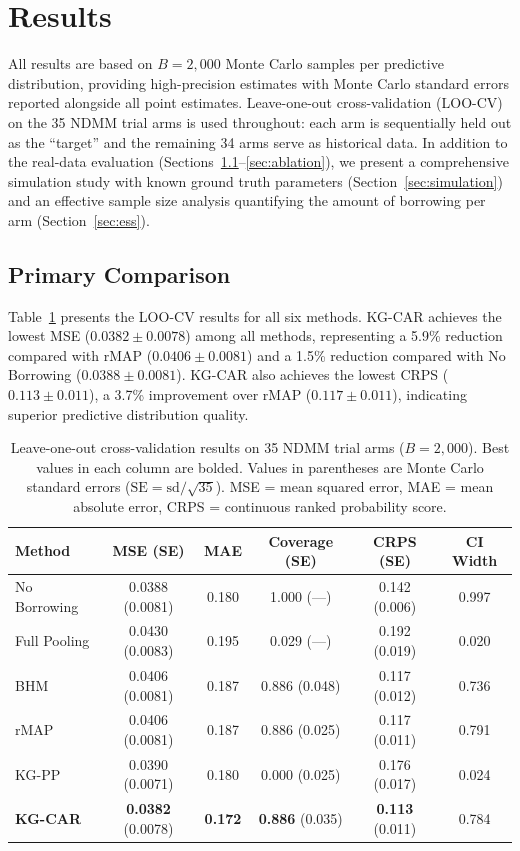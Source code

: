 \documentclass[12pt]{article}
\begin{document}
\section{Results}
\label{sec:results}

All results are based on $B = 2{,}000$ Monte Carlo samples per predictive distribution, providing high-precision estimates with Monte Carlo standard errors reported alongside all point estimates. Leave-one-out cross-validation (LOO-CV) on the 35 NDMM trial arms is used throughout: each arm is sequentially held out as the ``target'' and the remaining 34 arms serve as historical data. In addition to the real-data evaluation (Sections~\ref{sec:primary}--\ref{sec:ablation}), we present a comprehensive simulation study with known ground truth parameters (Section~\ref{sec:simulation}) and an effective sample size analysis quantifying the amount of borrowing per arm (Section~\ref{sec:ess}).

\subsection{Primary Comparison}
\label{sec:primary}

Table~\ref{tab:loocv} presents the LOO-CV results for all six methods. KG-CAR achieves the lowest MSE ($0.0382 \pm 0.0078$) among all methods, representing a 5.9\% reduction compared with rMAP ($0.0406 \pm 0.0081$) and a 1.5\% reduction compared with No Borrowing ($0.0388 \pm 0.0081$). KG-CAR also achieves the lowest CRPS ($0.113 \pm 0.011$), a 3.7\% improvement over rMAP ($0.117 \pm 0.011$), indicating superior predictive distribution quality.

\begin{table}[ht]
\centering
\caption{Leave-one-out cross-validation results on 35 NDMM trial arms ($B = 2{,}000$). Best values in each column are bolded. Values in parentheses are Monte Carlo standard errors ($\text{SE} = \text{sd}/\sqrt{35}$). MSE = mean squared error, MAE = mean absolute error, CRPS = continuous ranked probability score.}
\label{tab:loocv}
\begin{tabular}{lccccc}
\toprule
Method & MSE (SE) & MAE & Coverage (SE) & CRPS (SE) & CI Width \\
\midrule
No Borrowing & 0.0388 (0.0081) & 0.180 & 1.000 (---) & 0.142 (0.006) & 0.997 \\
Full Pooling & 0.0430 (0.0083) & 0.195 & 0.029 (---) & 0.192 (0.019) & 0.020 \\
BHM & 0.0406 (0.0081) & 0.187 & 0.886 (0.048) & 0.117 (0.012) & 0.736 \\
rMAP & 0.0406 (0.0081) & 0.187 & 0.886 (0.025) & 0.117 (0.011) & 0.791 \\
KG-PP & 0.0390 (0.0071) & 0.180 & 0.000 (0.025) & 0.176 (0.017) & 0.024 \\
\textbf{KG-CAR} & \textbf{0.0382} (0.0078) & \textbf{0.172} & \textbf{0.886} (0.035) & \textbf{0.113} (0.011) & 0.784 \\
\bottomrule
\end{tabular}
\end{table}
\end{document}
